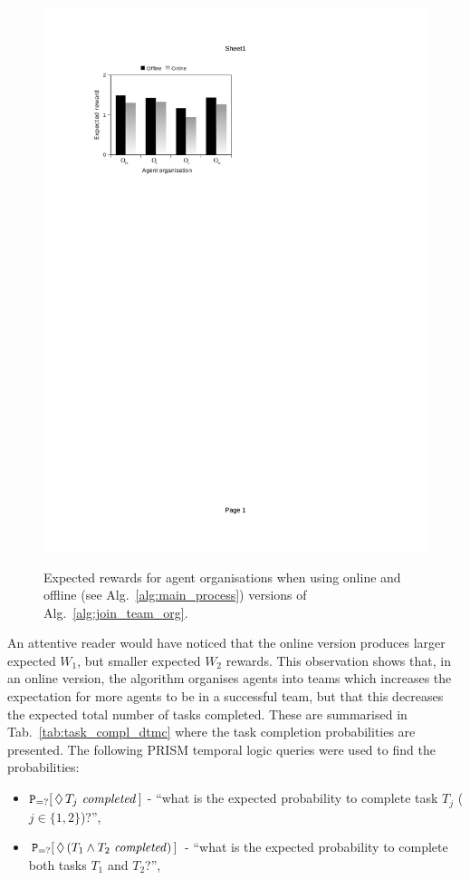 \documentclass{llncs}
\begin{document}
\begin{figure}[H]
{{  \includegraphics[clip=true, trim=70 579 300 90, scale=0.77]{images/w2_dtmc}
}}
\vspace{-10pt}
\caption{Expected rewards for agent organisations when using online and offline (see Alg.~\ref{alg:main_process}) versions of Alg.~\ref{alg:join_team_org}.}
\label{fig:bar_chart_dtmc}
\end{figure}
\vspace{-8mm}


An attentive reader would have noticed that the online version produces larger expected $W_1$, but smaller expected $W_2$ rewards. This observation shows that, in an online version, the algorithm organises agents into teams which increases the expectation for more agents to be in a successful team, but that this decreases the expected total number of tasks completed. These are summarised in Tab.~\ref{tab:task_compl_dtmc} where the task completion probabilities are presented. The following PRISM temporal logic queries were used to find the probabilities:
\vspace{-5pt}
\begin{itemize}
 \item ${\tt P}_{=?}[\,\Diamond\,T_{j} \mathit{\ completed}\,]$ -
``what is the expected probability to complete  task $T_j$ ($j\in\{1,2\}$)?'',
 \item ${\tt P}_{=?}[\,\Diamond\,(T_{1} \wedge T_2 \mathit{\ completed})\,]$ -
``what is the expected probability to complete  both tasks $T_1$ and $T_2$?'',
\end{itemize}
\vspace{-30pt}
\end{document}
